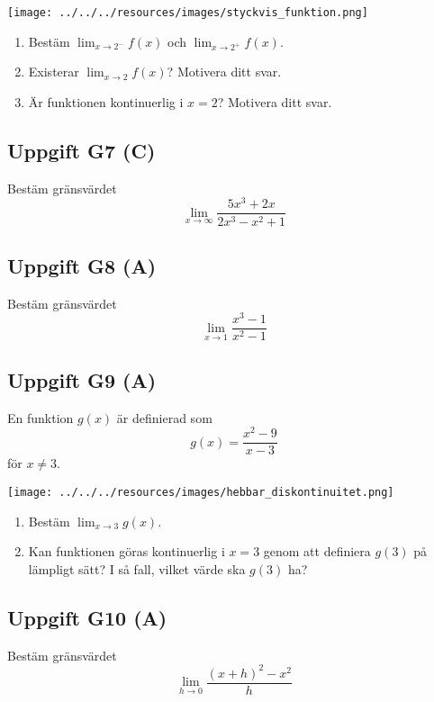 \documentclass[12pt]{article}
\begin{document}
\begin{center}
\texttt{[image: ../../../resources/images/styckvis\_funktion.png]}
\end{center}

\begin{enumerate}[label=\alph*)]
    \item Bestäm $\lim_{x \to 2^-} f(x)$ och $\lim_{x \to 2^+} f(x)$.
    \item Existerar $\lim_{x \to 2} f(x)$? Motivera ditt svar.
    \item Är funktionen kontinuerlig i $x = 2$? Motivera ditt svar.
\end{enumerate}

\subsection*{Uppgift G7 (C)}
Bestäm gränsvärdet
\[
\lim_{x \to \infty} \frac{5x^3 + 2x}{2x^3 - x^2 + 1}
\]

\subsection*{Uppgift G8 (A)}
Bestäm gränsvärdet
\[
\lim_{x \to 1} \frac{x^3 - 1}{x^2 - 1}
\]

\subsection*{Uppgift G9 (A)}
En funktion $g(x)$ är definierad som
\[
g(x) = \frac{x^2 - 9}{x - 3}
\]
för $x \neq 3$.

\begin{center}
\texttt{[image: ../../../resources/images/hebbar\_diskontinuitet.png]}
\end{center}

\begin{enumerate}[label=\alph*)]
    \item Bestäm $\lim_{x \to 3} g(x)$.
    \item Kan funktionen göras kontinuerlig i $x = 3$ genom att definiera $g(3)$ på lämpligt sätt? I så fall, vilket värde ska $g(3)$ ha?
\end{enumerate}

\subsection*{Uppgift G10 (A)}
Bestäm gränsvärdet
\[
\lim_{h \to 0} \frac{(x + h)^2 - x^2}{h}
\]
\end{document}
